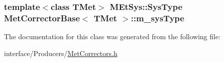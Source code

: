 \label{classMetCorrectorBase_aaf1ddd88ab9c9070e006cf6d69ce1ca6}
\hypertarget{classMetCorrectorBase_addd0772673419e699b040fe06cc6db74}{
\subsubsection[{m\_\-sysType}]{\setlength{\rightskip}{0pt plus 5cm}template$<$class TMet$>$ {\bf MEtSys::SysType} {\bf MetCorrectorBase}$<$ TMet $>$::{\bf m\_\-sysType}}}
\label{classMetCorrectorBase_addd0772673419e699b040fe06cc6db74}


The documentation for this class was generated from the following file:\begin{DoxyCompactItemize}
\item 
interface/Producers/\hyperlink{MetCorrectors_8h}{MetCorrectors.h}\end{DoxyCompactItemize}
